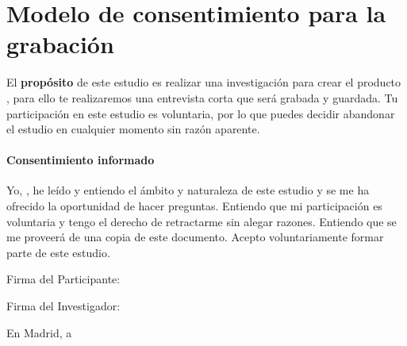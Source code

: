 \chapter{Modelo de consentimiento para la grabación}
\label{ch:consentimiento}
El \textbf{propósito} de este estudio es realizar una investigación para crear el producto \productname, para ello te realizaremos una entrevista corta que será grabada y guardada. Tu participación en este estudio es voluntaria, por lo que puedes decidir abandonar el estudio en cualquier momento sin razón aparente.

\subsubsection*{Consentimiento informado}
Yo, \underline{\hspace{7cm}}, he leído y entiendo el ámbito y naturaleza de este estudio y se me ha ofrecido la oportunidad de hacer preguntas. Entiendo que mi participación es voluntaria y tengo el derecho de retractarme sin alegar razones. Entiendo que se me proveerá de una copia de este documento. Acepto voluntariamente formar parte de este estudio.

\vspace{.5cm}
\begin{minipage}{.5\textwidth}
Firma del Participante:
\end{minipage}%
\begin{minipage}{.5\textwidth}
Firma del Investigador:
\end{minipage}

\vspace{3cm}

{\flushright En Madrid, a \underline{\hspace{10cm}}}
